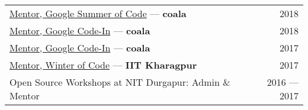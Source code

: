 \begin{tabularx}{\textwidth}{Xr}
\href{https://docs.naveenkumarsangi.me/gsoc-mentor.pdf}{Mentor, Google Summer of Code} --- \textbf{coala} & 2018 \\
\href{https://docs.naveenkumarsangi.me/gci-mentor-2018.pdf}{Mentor, Google Code-In} --- \textbf{coala} & 2018 \\
\href{https://docs.naveenkumarsangi.me/gci-mentor-2017.pdf}{Mentor, Google Code-In} --- \textbf{coala} & 2017 \\
\href{https://docs.naveenkumarsangi.me/kwoc.jpg}{Mentor, Winter of Code} --- \textbf{IIT Kharagpur} & 2017 \\
Open Source Workshops at NIT Durgapur: Admin \& Mentor & 2016 --- 2017
\end{tabularx}